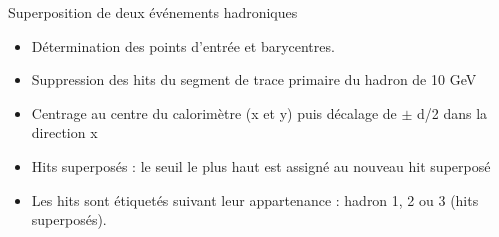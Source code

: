 \documentclass[8pt]{beamer}
\begin{document}
\begin{frame}
\begin{block}{Superposition de deux événements hadroniques}
      \begin{itemize}
        \item Détermination des points d'entrée et barycentres.
        \item Suppression des hits du segment de trace primaire du hadron de 10 GeV
        \item Centrage au centre du calorimètre (x et y) puis décalage de $\pm$ d/2 dans la direction x
        \item Hits superposés : le seuil le plus haut est assigné au nouveau hit superposé
        \item Les hits sont étiquetés suivant leur appartenance : hadron 1, 2 ou 3 (hits superposés).
      \end{itemize}
    \end{block}
  \end{frame}
\end{document}

